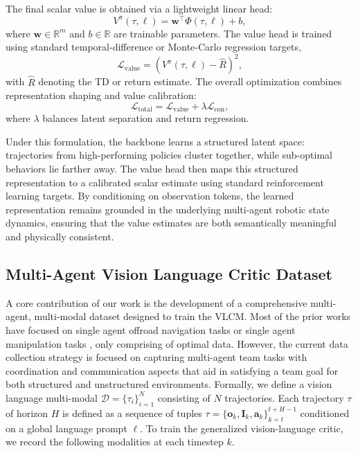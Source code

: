 \documentclass[letterpaper, 10 pt, conference]{ieeeconf}  %
\begin{document}
The final scalar value is obtained via a lightweight linear head:
\begin{equation}
V^\pi(\tau,\ell) = \mathbf{w}^\top \Phi(\tau,\ell) + b,
\end{equation}
where $\mathbf{w}\in\mathbb{R}^m$ and $b\in\mathbb{R}$ are trainable parameters. The value head is trained using standard temporal-difference or Monte-Carlo regression targets,
\begin{equation}
\mathcal{L}_{\mathrm{value}} 
=
\left( V^\pi(\tau,\ell) - \hat{R} \right)^2,
\end{equation}
with $\hat{R}$ denoting the TD or return estimate. The overall optimization combines representation shaping and value calibration:
\begin{equation}
\mathcal{L}_{\mathrm{total}} 
=
\mathcal{L}_{\mathrm{value}} 
+ \lambda \mathcal{L}_{\mathrm{con}},
\end{equation}
where $\lambda$ balances latent separation and return regression.


Under this formulation, the backbone learns a structured latent space: trajectories from high-performing policies cluster together, while sub-optimal behaviors lie farther away. The value head then maps this structured representation to a calibrated scalar estimate using standard reinforcement learning targets. By conditioning on observation tokens, the learned representation remains grounded in the underlying multi-agent robotic state dynamics, ensuring that the value estimates are both semantically meaningful and physically consistent.


\subsection{Multi-Agent Vision Language Critic Dataset}
\label{subsec:dataset}

A core contribution of our work is the development of a comprehensive multi-agent, multi-modal dataset designed to train the VLCM. Most of the prior works have focused on single agent offroad navigation tasks \cite{triest2022tartandrive} or single agent manipulation tasks \cite{Khazatskyetal2024}, only comprising of optimal data. However, the current data collection strategy is focused on capturing  multi-agent team tasks with coordination and communication aspects that aid in satisfying a team goal for both structured and unstructured environments. 
Formally, we define a vision language multi-modal $\mathcal{D} = \{ \tau_i \}_{i=1}^N$ consisting of $N$ trajectories. Each trajectory $\tau$ of horizon $H$ is defined as a sequence of tuples $\tau = \{\mathbf{o}_k,\mathbf{I}_k, \mathbf{a}_k\}_{k=t}^{t+H-1}$ conditioned on a global language prompt $\ell$. To train the generalized vision-language critic, we record the following modalities at each timestep $k$.
\end{document}
